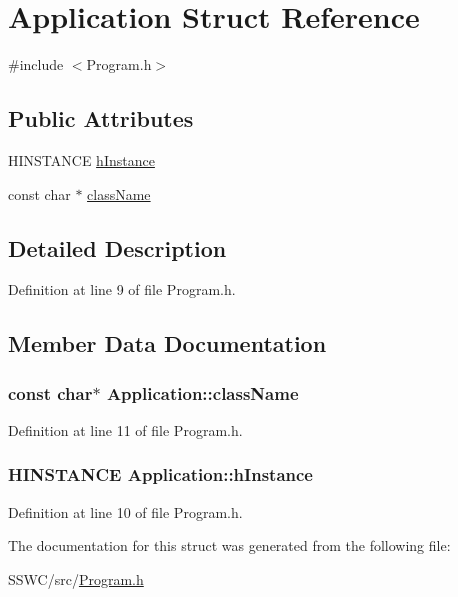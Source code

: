 \hypertarget{struct_application}{\section{Application Struct Reference}
\label{struct_application}
}


{\ttfamily \#include $<$Program.\+h$>$}

\subsection*{Public Attributes}
\begin{DoxyCompactItemize}
\item 
H\+I\+N\+S\+T\+A\+N\+C\+E \hyperlink{struct_application_a50a4c8fe3389ff7a4bdf984218a77e27}{h\+Instance}
\item 
const char $\ast$ \hyperlink{struct_application_aad4aa014a3fa43261622e8779d626637}{class\+Name}
\end{DoxyCompactItemize}


\subsection{Detailed Description}


Definition at line 9 of file Program.\+h.



\subsection{Member Data Documentation}
\hypertarget{struct_application_aad4aa014a3fa43261622e8779d626637}{
\subsubsection[{class\+Name}]{\setlength{\rightskip}{0pt plus 5cm}const char$\ast$ Application\+::class\+Name}}\label{struct_application_aad4aa014a3fa43261622e8779d626637}


Definition at line 11 of file Program.\+h.

\hypertarget{struct_application_a50a4c8fe3389ff7a4bdf984218a77e27}{
\subsubsection[{h\+Instance}]{\setlength{\rightskip}{0pt plus 5cm}H\+I\+N\+S\+T\+A\+N\+C\+E Application\+::h\+Instance}}\label{struct_application_a50a4c8fe3389ff7a4bdf984218a77e27}


Definition at line 10 of file Program.\+h.



The documentation for this struct was generated from the following file\+:\begin{DoxyCompactItemize}
\item 
S\+S\+W\+C/src/\hyperlink{_program_8h}{Program.\+h}\end{DoxyCompactItemize}
